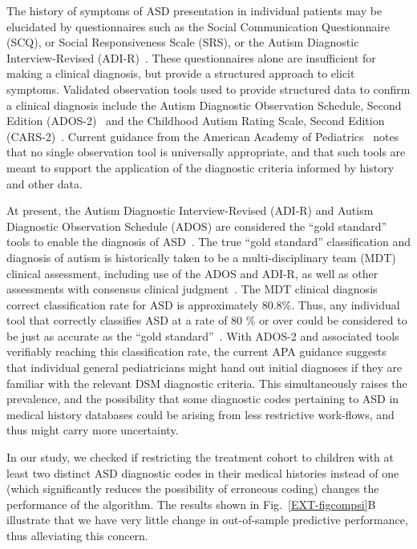 \documentclass[onecolumn,,10pt]{IEEEtran}
\begin{document}
The history of symptoms of  ASD presentation in individual patients may be elucidated by questionnaires such as
the Social Communication Questionnaire (SCQ), or Social Responsiveness
Scale (SRS), or the Autism Diagnostic Interview-Revised (ADI-R)~\cite{hyman2020identification}. These questionnaires alone are insufficient for making a clinical diagnosis, but provide a structured approach to
elicit symptoms. Validated observation tools used to provide structured data to confirm a clinical diagnosis include the Autism Diagnostic Observation Schedule,
Second Edition (ADOS-2)~\cite{esler2015autism} and the
Childhood Autism Rating Scale,
Second Edition (CARS-2)~\cite{chlebowski2010using}. Current guidance from the American Academy of Pediatrics~\cite{hyman2020identification}   notes that no single
observation tool is universally appropriate,
and that such tools are meant to support the application of the diagnostic criteria informed by history
and other data.

At present, the Autism Diagnostic Interview-Revised (ADI-R) and Autism Diagnostic Observation
Schedule (ADOS) are considered the ``gold
standard'' tools to enable the  diagnosis of ASD~\cite{falkmer2013diagnostic}. 
The true  ``gold standard'' classification and diagnosis of autism is historically taken to be a multi-disciplinary team (MDT) clinical assessment, including use of the ADOS and
ADI-R, as well as other assessments with consensus clinical judgment~\cite{falkmer2013diagnostic}.  
The MDT clinical diagnosis correct classification rate for ASD is approximately 80.8\%. Thus, any individual tool that correctly classifies ASD at a rate of 80 \% or over could be considered to be just as accurate as the ``gold standard''~\cite{falkmer2013diagnostic}. With ADOS-2 and associated tools verifiably  reaching this classification rate, the current APA guidance suggests that individual general pediatricians might hand out initial diagnoses if they are familiar with the relevant DSM diagnostic criteria. This simultaneously raises the prevalence, and  the possibility that  some diagnostic codes pertaining to ASD in medical history databases could be arising from less restrictive work-flows, and thus might carry more uncertainty.

In our study, we checked if restricting the treatment cohort to children with at least two  distinct ASD diagnostic codes in their medical histories instead of one (which significantly reduces the possibility of erroneous coding) changes the performance of the algorithm. The results  shown in Fig.~\ref{EXT-figcompsi}B illustrate that we have very little change in out-of-sample predictive performance, thus alleviating this concern.
\end{document}
